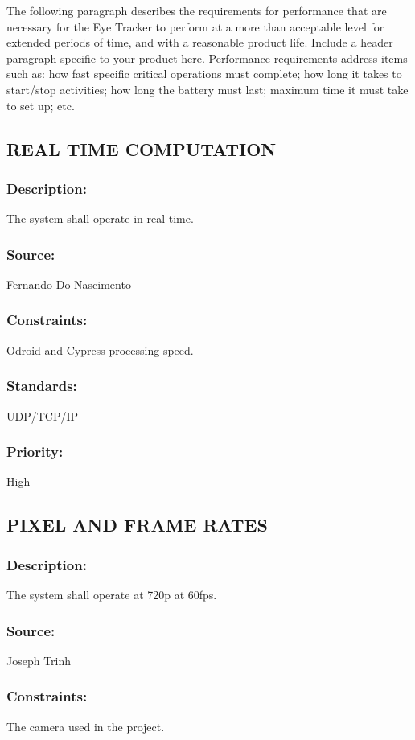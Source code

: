 The following paragraph describes the requirements for performance that are necessary for the Eye Tracker to perform at a more than acceptable level for extended periods of time, and with a reasonable product life.
Include a header paragraph specific to your product here. Performance requirements address items such as: how fast specific critical operations must complete; how long it takes to start/stop activities; how long the battery must last; maximum time it must take to set up; etc.

\subsection{\text REAL TIME COMPUTATION}
\subsubsection{Description:} 
	{The system shall operate in real time.}
\subsubsection{Source:} 
	{Fernando Do Nascimento}
\subsubsection{Constraints:} 
	{Odroid and Cypress processing speed.}
\subsubsection{Standards:} 
	{UDP/TCP/IP}
\subsubsection{Priority:} 
	{High}

\subsection{\text PIXEL AND FRAME RATES}
\subsubsection{Description:} 
	{The system shall operate at 720p at 60fps.}
\subsubsection{Source:} 
	{Joseph Trinh}
\subsubsection{Constraints:} 
	{The camera used in the project.}
